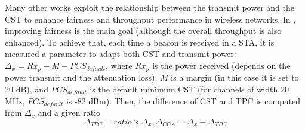 \documentclass[12pt, a4paper,twoside]{tesi_upf}
\begin{document}
			Many other works exploit the relationship between the transmit power and the CST to enhance fairness and throughput performance in wireless networks. In \cite{jamil2015preserving}, improving fairness is the main goal (although the overall throughput is also enhanced). To achieve that, each time a beacon is received in a STA, it is measured a parameter to adapt both CST and transmit power: $\Delta_x = Rx_p - M - PCS_{default}$, where $Rx_p$ is the power received (depends on the power transmit and the attenuation loss), $M$ is a margin (in this case it is set to 20 dB), and $PCS_{default}$ is the default minimum CST (for channels of width 20 MHz, $PCS_{default}$ is -82 dBm). Then, the difference of CST and TPC is computed from $\Delta_x$ and a given ratio
			\begin{equation}
				\Delta_{TPC} = ratio \times \Delta_x, \Delta_{CCA} = \Delta_x - \Delta_{TPC}
				\nonumber
			\end{equation}
\end{document}
